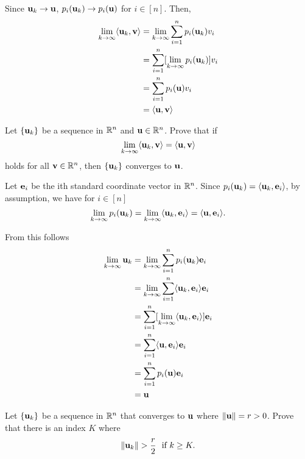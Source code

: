 \documentclass[letterpaper, twoside, 12pt]{book}
\begin{document}
\begin{solution}
    Since \(\mathbf u_k \to \mathbf u\), \(p_i(\mathbf u_k) \to p_i(\mathbf u)\) for
    \(i \in [n]\). Then,
    \begin{align*} 
        \lim_{k \to \infty} \langle\mathbf u_k, \mathbf v \rangle &= \lim_{k \to \infty} \sum_{i = 1}^n p_i(\mathbf u_k) v_i \\
                        &= \sum_{i = 1}^n [\lim_{k \to \infty} p_i(\mathbf u_k)] v_i \\
                        &= \sum_{i = 1}^n p_i(\mathbf u) v_i \\
                        &= \langle\mathbf u, \mathbf v \rangle \\
    \end{align*}
\end{solution}

\begin{exercise}[2]
  Let \(\{\mathbf u_k\}\) be a sequence in \(\mathbb R^n\) and
  \(\mathbf u\in\mathbb R^n\). Prove that if
  \[
    \lim_{k\to\infty}\langle\mathbf u_k,\mathbf v\rangle=\langle\mathbf u,\mathbf v\rangle
  \]
  holds for all \(\mathbf v\in\mathbb R^n\), then \(\{\mathbf u_k\}\) converges
  to \(\mathbf u\).
\end{exercise}

\begin{solution}
    Let \(\mathbf e_i\) be the ith standard coordinate vector in \(\mathbb R^n\).
    Since \(p_i(\mathbf u_k) = \langle\mathbf u_k, \mathbf e_i \rangle\), by assumption, we have for \(i \in [n]\)
    \[ \lim_{k \to \infty} p_i(\mathbf u_k) = 
        \lim_{k \to \infty} \langle\mathbf u_k, \mathbf e_i\rangle = 
    \langle \mathbf u, \mathbf e_i \rangle .\]

    From this follows
    \begin{align*} 
        \lim_{k \to \infty} \mathbf u_k &= \lim_{k \to \infty} \sum_{i = 1}^n p_i(\mathbf u_k) \mathbf e_i \\
                    &= \lim_{k \to \infty} \sum_{i = 1}^n \langle\mathbf u_k, \mathbf e_i \rangle \mathbf e_i \\
                    &= \sum_{i = 1}^n [\lim_{k \to \infty} \langle\mathbf u_k, \mathbf e_i \rangle] \mathbf e_i \\
                    &= \sum_{i = 1}^n \langle\mathbf u, \mathbf e_i \rangle \mathbf e_i \\
                    &= \sum_{i = 1}^n p_i(\mathbf u) \mathbf e_i \\
                    &= \mathbf u \\
    \end{align*}
\end{solution}

\begin{exercise}[5]
  Let \(\{\mathbf u_k\}\) be a sequence in \(\mathbb R^n\) that converges to
  \(\mathbf u\) where \(\|\mathbf u\|= r >0\). Prove that there is an index \(K\)
  where
  \[
    \|\vect u_k\|>\frac{r}{2}
    \text{~~if~}
    k\geq K
  .\]
\end{exercise}
\end{document}
